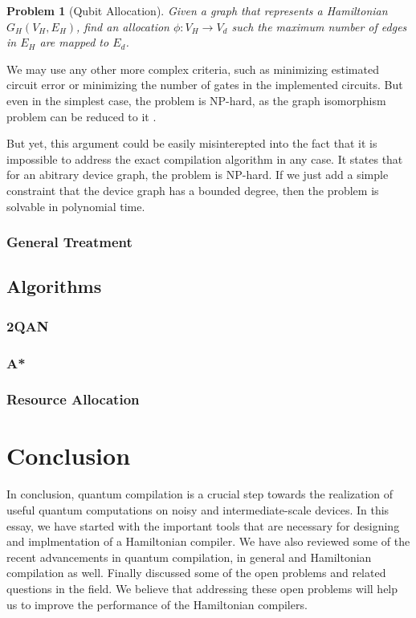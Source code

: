 \documentclass{report}
\newtheorem{problem}{Problem}
\begin{document}
\begin{problem}[Qubit Allocation]
  Given a graph that represents a Hamiltonian $G_H(V_H, E_H)$, find an allocation $\phi : V_H \to  V_d$ such the maximum number of edges in $E_H$ are mapped to $E_d$.
\end{problem}

We may use any other more complex criteria, such as minimizing estimated circuit error or minimizing the number of gates in the implemented circuits. But even in the simplest case, the problem is NP-hard, as the graph isomorphism problem can be reduced to it \cite{?}.

But yet, this argument could be easily misinterepted into the fact that it is impossible to address the exact compilation algorithm in any case. It states that for an abitrary device graph, the problem is NP-hard. If we just add a simple constraint that the device graph has a bounded degree, then the problem is solvable in polynomial time. \cite{?}

\subsection{General Treatment}

\section{Algorithms}
\subsection{2QAN}
\subsection{A*}
\subsection{Resource Allocation}



\chapter{Conclusion}\label{chap:conclusion}

In conclusion, quantum compilation is a crucial step towards the realization of useful quantum computations on noisy and intermediate-scale devices. In this essay, we have started with the important tools that are necessary for designing and implmentation of a Hamiltonian compiler. We have also reviewed some of the recent advancements in quantum compilation, in general and Hamiltonian compilation as well. Finally discussed some of the open problems and related questions in the field. We believe that addressing these open problems will help us to improve the performance of the Hamiltonian compilers.

\printbibliography
\end{document}
